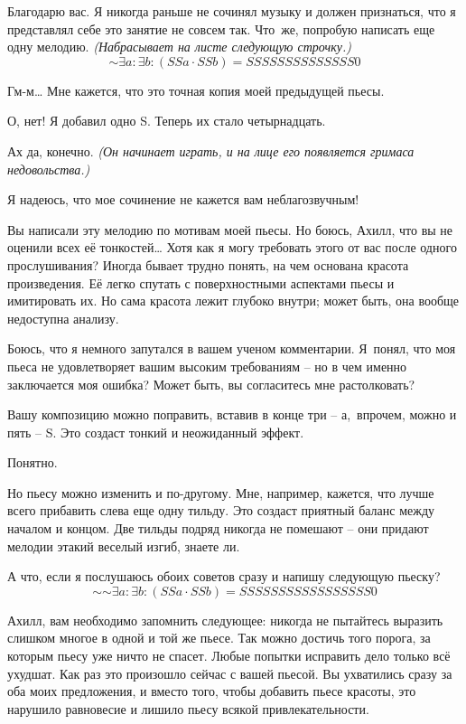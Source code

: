 \documentclass[../main.tex]{subfiles}
\begin{document}
\begin{dialogue}
 Благодарю вас. Я никогда раньше не сочинял музыку и должен признаться, что я представлял себе это занятие не совсем так. Что~же, попробую написать еще одну мелодию. \emph{(Набрасывает на листе следующую строчку.)}
\[
    \mathord{\sim} \exists a \colon \exists b \colon (SSa \cdot SSb) = SSSSSSSSSSSSSS0
\]

 Гм-м\ldots{} Мне кажется, что это точная копия моей предыдущей пьесы.

 О, нет! Я добавил одно S\@. Теперь их стало четырнадцать.

 Ах да, конечно. \emph{(Он начинает играть, и на лице его появляется гримаса недовольства.)}

 Я надеюсь, что мое сочинение не кажется вам неблагозвучным!

 Вы написали эту мелодию по мотивам моей пьесы. Но боюсь, Ахилл, что вы не оценили всех её тонкостей\ldots{} Хотя как я могу требовать этого от вас после одного прослушивания? Иногда бывает трудно понять, на чем основана красота произведения. Её легко спутать с поверхностными аспектами пьесы и имитировать их. Но сама красота лежит глубоко внутри; может быть, она вообще недоступна анализу.

 Боюсь, что я немного запутался в вашем ученом комментарии. Я~понял, что моя пьеса не удовлетворяет вашим высоким требованиям \--- но в чем именно заключается моя ошибка? Может быть, вы согласитесь мне растолковать?

 Вашу композицию можно поправить, вставив в конце три \--- а,~впрочем, можно и пять \--- S. Это создаст тонкий и неожиданный эффект.

 Понятно.

 Но пьесу можно изменить и по-другому. Мне, например, кажется, что лучше всего прибавить слева еще одну тильду. Это создаст приятный баланс между началом и концом. Две тильды подряд никогда не помешают \--- они придают мелодии этакий веселый изгиб, знаете ли.

 А что, если я послушаюсь обоих советов сразу и напишу следующую пьеску?
\[
    \mathord{\sim}\mathord{\sim} \exists a \colon \exists b \colon (SSa \cdot SSb) = SSSSSSSSSSSSSSSSS0
\]

 Ахилл, вам необходимо запомнить следующее: никогда не пытайтесь выразить слишком многое в одной и той же пьесе. Так можно достичь того порога, за которым пьесу уже ничто не спасет. Любые попытки исправить дело только всё ухудшат. Как раз это произошло сейчас с вашей пьесой. Вы ухватились сразу за оба моих предложения, и вместо того, чтобы добавить пьесе красоты, это нарушило равновесие и лишило пьесу всякой привлекательности.


\end{dialogue}
\end{document}
